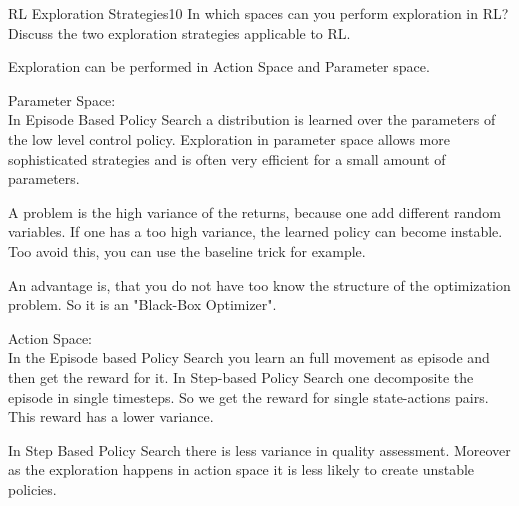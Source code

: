 
\begin{questions}
	

\begin{question}{RL Exploration Strategies}{10}
	In which spaces can you perform exploration in RL? Discuss the two  exploration strategies applicable to RL.
	
\begin{answer}
Exploration can be performed in Action Space and Parameter space.

Parameter Space:\\
In Episode Based Policy Search a distribution is learned over the parameters of the low level control policy. Exploration in parameter space allows more sophisticated strategies and is often very efficient for a small amount of parameters. 

A problem is the high variance of the returns, because one add different random variables. If one has a too high variance, the learned policy can become instable. Too avoid this, you can use the baseline trick for example.

An advantage is, that you do not have too know the structure of the optimization problem. So it is an "Black-Box Optimizer".

Action Space:\\
In the Episode based Policy Search you learn an full movement as episode and then get the reward for it. In Step-based Policy Search one decomposite the episode in single timesteps. So we get the reward for single state-actions pairs. This reward has a lower variance.

In Step Based Policy Search there is less variance in quality assessment. Moreover as the exploration happens in action space it is less likely to create unstable policies.
\end{answer}
\end{question}




\end{questions}